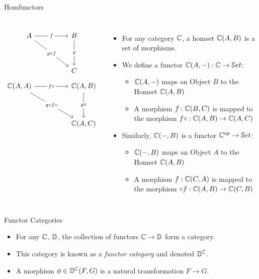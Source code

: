 \begin{frame}[fragile]{Homfunctors}
	\begin{columns}
		\[\begin{tikzcd}
			A && B \\
			\\
			&& C
			\arrow["f"{description}, from=1-1, to=1-3]
			\arrow["{g \circ f}"{description}, from=1-1, to=3-3]
			\arrow["g"{description}, from=1-3, to=3-3]
		\end{tikzcd}\]
		\[\begin{tikzcd}
			{\bC(A,A)} && {\bC(A,B)}\\
			\\
			&& {\bC(A,C)}
			\arrow["{f \circ}"{description}, from=1-1, to=1-3]
			\arrow["{g \circ f \circ}"{description}, from=1-1, to=3-3]
			\arrow["{g \circ}"{description}, from=1-3, to=3-3]
		\end{tikzcd}\]
		\begin{itemize}
			\item For any category $\mathbb{C}$, a homset $\mathbb{C}(A,B)$ is a set of morphisms.
			\pause\item We define a functor $\mathbb{C}(A, -) : \mathbb{C} \to \mathbb{S}et$:
			\begin{itemize}
				\pause\item $\mathbb{C}(A, -)$ maps an Object $B$ to the Homset $\mathbb{C}(A,B)$
				\pause\item A morphism $f : \mathbb{C}(B,C)$ is mapped to the morphism $f \circ : \mathbb{C}(A,B) \to \mathbb{C}(A,C)$
			\end{itemize}
			\pause\item Similarly, $\mathbb{C}(-, B)$ is a functor $\mathbb{C}^{op} \to \mathbb{S}et$:
			\begin{itemize}
				\pause\item $\mathbb{C}(-, B)$ maps an Object $A$ to the Homset $\mathbb{C}(A,B)$
				\pause\item A morphism $f : \mathbb{C}(C,A)$ is mapped to the morphism $\circ f: \mathbb{C}(A,B) \to \mathbb{C}(C,B)$
			\end{itemize}
		\end{itemize}
	\end{columns}
\end{frame}

\begin{frame}{Functor Categories}
 \begin{itemize}
  \item For any $\mathbb{C}$, $\mathbb{D}$, the collection of functors $\mathbb{C} \to \mathbb{D}$ form a category.
  \pause\item This category is known as a \textit{functor category} and denoted $\mathbb{D}^{\mathbb{C}}$.
  \pause\item A morphism $\phi \in \mathbb{D}^{\mathbb{C}}(F, G)$ is a natural transformation $F \to G$.
 \end{itemize}
\end{frame}
